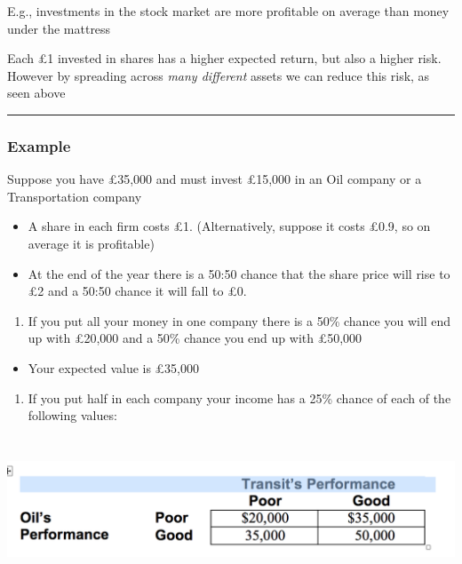 \documentclass[]{article}
\providecommand{\tightlist}{%
  \setlength{\itemsep}{0pt}\setlength{\parskip}{0pt}}
\begin{document}
\bigskip

E.g., investments in the stock market are more profitable on average
than money under the mattress

Each £1 invested in shares has a higher expected return, but also a
higher risk. However by spreading across \emph{many different} assets we
can reduce this risk, as seen above

\begin{center}\rule{0.5\linewidth}{\linethickness}\end{center}

\hypertarget{example}{%
\subsubsection{Example}\label{example}}

Suppose you have \pounds35,000 and must invest \pounds15,000 in an Oil
company or a Transportation company

\begin{itemize}
\item
  A share in each firm costs \pounds 1. (Alternatively, suppose it costs
  \pounds 0.9, so on average it is profitable)
\item
  At the end of the year there is a 50:50 chance that the share price
  will rise to £2 and a 50:50 chance it will fall to \pounds 0.
\end{itemize}

\begin{enumerate}
\def\labelenumi{\arabic{enumi}.}
\tightlist
\item
  If you put all your money in one company there is a 50\% chance you
  will end up with £20,000 and a 50\% chance you end up with
  \pounds 50,000
\end{enumerate}

\begin{itemize}
\tightlist
\item
  Your expected value is \pounds 35,000
\end{itemize}

\begin{enumerate}
\def\labelenumi{\arabic{enumi}.}
\setcounter{enumi}{1}
\tightlist
\item
  If you put half in each company your income has a 25\% chance of each
  of the following values:
\end{enumerate}

\includegraphics[height=1.7in]{picsfigs/oiltransitperformance.png}
\end{document}
